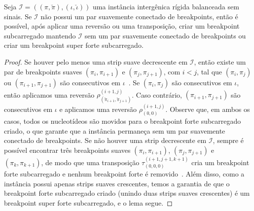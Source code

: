 \begin{lemma}\label{lemma:OJTODIFY}
Seja $\mathcal{I} = ((\pi,\breve\pi),(\iota,\breve\iota))$ uma instância intergênica rígida balanceada sem sinais. Se $\mathcal{I}$ não possui um par suavemente conectado de breakpoints, então é possível, após aplicar uma reversão ou uma transposição, criar um breakpoint subcarregado mantendo $\mathcal{I}$ sem um par suavemente conectado de breakpoints ou criar um breakpoint super forte subcarregado.
\end{lemma}
\begin{proof}
Se houver pelo menos uma strip suave decrescente em $\mathcal{I}$, então existe um par de breakpoints suaves $(\pi_{i},\pi_{i+1})$ e $(\pi_{j},\pi_ {j+1})$, com $i <j$, tal que $(\pi_{i},\pi_{j})$ ou $(\pi_{i+1},\pi_{j+1} )$ são consecutivos em $\iota$~\cite{1995-kececioglu-sankoff}. Se $(\pi_{i},\pi_{j})$ são consecutivos em $\iota$, então aplicamos uma reversão $\rho_{(\breve\pi_{i+1},\breve\pi_{j +1})}^{(i+1, j)}$. Caso contrário, $(\pi_{i+1}, \pi_{j+1})$ são consecutivos em $\iota$ e aplicamos uma reversão $\rho_{(0, 0)}^{(i+1, j)}$. Observe que, em ambos os casos, todos os nucleotídeos são movidos para o breakpoint forte subcarregado criado, o que garante que a instância permaneça sem um par suavemente conectado de breakpoints. Se não houver uma strip decrescente em $\mathcal{I}$, sempre é possível encontrar três breakpoints suaves $(\pi_{i},\pi_{i+1})$, $(\pi_{j},\pi_{ j+1})$ e $(\pi_{k},\pi_{k+1})$, de modo que uma transposição $\tau_{(0,0,0)}^{(i+1,j +1,k+1)}$ cria um breakpoint forte subcarregado e nenhum breakpoint forte é removido~\cite{1998-walter-etal}. Além disso, como a instância possui apenas strips suaves crescentes, temos a garantia de que o breakpoint forte subcarregado criado (unindo duas strips suaves crescentes) é um breakpoint super forte subcarregado, e o lema segue.
\end{proof}

